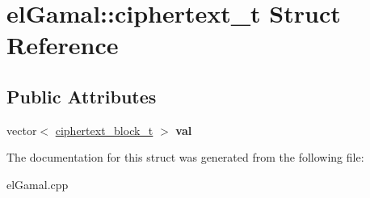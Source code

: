 \hypertarget{structelGamal_1_1ciphertext__t}{}\section{el\+Gamal\+:\+:ciphertext\+\_\+t Struct Reference}
\label{structelGamal_1_1ciphertext__t}
\subsection*{Public Attributes}
\begin{DoxyCompactItemize}
\item 
\mbox{\label{structelGamal_1_1ciphertext__t_a3d23b4518b8c004ee97a8e5e41d0c868}} 
vector$<$ \mbox{\hyperlink{structelGamal_1_1ciphertext__block__t}{ciphertext\+\_\+block\+\_\+t}} $>$ {\bfseries val}
\end{DoxyCompactItemize}


The documentation for this struct was generated from the following file\+:\begin{DoxyCompactItemize}
\item 
el\+Gamal.\+cpp\end{DoxyCompactItemize}

